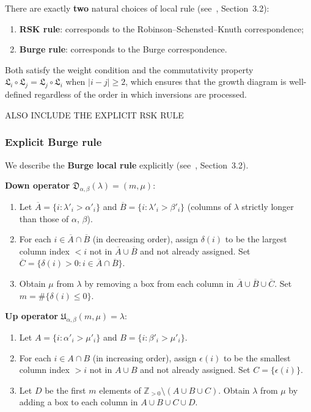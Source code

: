 \documentclass[11pt]{article}
\theoremstyle{plain}
\theoremstyle{definition}
\theoremstyle{remark}
\newcommand{\Z}{\mathbb{Z}}
\begin{document}
There are exactly \textbf{two} natural choices of local rule
(see~\cite{langer-thesis}, Section~3.2):
\begin{enumerate}
\item \textbf{RSK rule}: corresponds to the Robinson--Schensted--Knuth
  correspondence;
\item \textbf{Burge rule}: corresponds to the Burge correspondence.
\end{enumerate}
Both satisfy the weight condition and the commutativity property
$\mathfrak{L}_i \circ \mathfrak{L}_j = \mathfrak{L}_j \circ \mathfrak{L}_i$
when $|i - j| \geq 2$, which ensures that the growth diagram
is well-defined regardless of the order in which inversions are processed.


ALSO INCLUDE THE EXPLICIT RSK RULE

\subsubsection*{Explicit Burge rule}

We describe the \textbf{Burge local rule} explicitly
(see~\cite{langer-thesis}, Section~3.2).

\smallskip\noindent\textbf{Down operator}
$\mathfrak{D}_{\alpha,\beta}(\lambda) = (m, \mu)$:
\begin{enumerate}
\item Let $\overline{A} = \{i : \lambda'_i > \alpha'_i\}$
  and $\overline{B} = \{i : \lambda'_i > \beta'_i\}$
  (columns of $\lambda$ strictly longer than those of
  $\alpha$, $\beta$).
\item For each $i \in \overline{A} \cap \overline{B}$
  (in decreasing order), assign $\delta(i)$ to be the
  largest column index $< i$ not in
  $\overline{A} \cup \overline{B}$ and not already assigned.
  Set $\overline{C} = \{\delta(i) > 0 : i \in \overline{A} \cap \overline{B}\}$.
\item Obtain $\mu$ from $\lambda$ by removing a box from
  each column in $\overline{A} \cup \overline{B} \cup \overline{C}$.
  Set $m = \#\{\delta(i) \leq 0\}$.
\end{enumerate}

\smallskip\noindent\textbf{Up operator}
$\mathfrak{U}_{\alpha,\beta}(m, \mu) = \lambda$:
\begin{enumerate}
\item Let $A = \{i : \alpha'_i > \mu'_i\}$
  and $B = \{i : \beta'_i > \mu'_i\}$.
\item For each $i \in A \cap B$ (in increasing order),
  assign $\epsilon(i)$ to be the smallest column index
  $> i$ not in $A \cup B$ and not already assigned.
  Set $C = \{\epsilon(i)\}$.
\item Let $D$ be the first $m$ elements of
  $\Z_{>0} \setminus (A \cup B \cup C)$.
  Obtain $\lambda$ from $\mu$ by adding a box to each column
  in $A \cup B \cup C \cup D$.
\end{enumerate}
\end{document}

